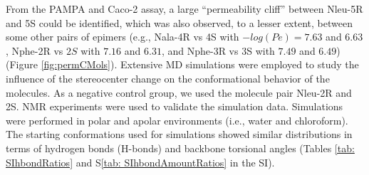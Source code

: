 From the PAMPA and Caco-2 assay, a large “permeability cliff”  between Nleu-5R and 5S could be identified, which was also observed, to a lesser extent, between some other pairs of epimers (e.g., Nala-4R vs 4S with $−log(Pe) = 7.63$ and $6.63$, Nphe-2R vs $2S$ with $7.16$ and $6.31$, and Nphe-3R vs 3S with $7.49$ and $6.49$) (Figure \ref{fig:permCMols}). 
Extensive MD simulations were employed to study the influence of the stereocenter change on the conformational behavior of the molecules. As a negative control group, we used the molecule pair Nleu-2R and 2S. 
NMR experiments were used to validate the simulation data. Simulations were performed in polar and apolar environments (i.e., water and chloroform). 
The starting conformations used for simulations showed similar distributions in terms of hydrogen bonds (H-bonds) and backbone torsional angles (Tables \ref{tab: SIhbondRatios} and S\ref{tab: SIhbondAmountRatios} in the SI). 

\begin{table}[]
\centering
\caption{Hydrogen bond occurrence in percentage for the starting conformations of
Nleu-5R, Nleu-5S, Nleu-2R, and Nleu-2S.}
\label{tab: SIhbondRatios}
\end{table}


\begin{table}[]
\centering
\caption{ Percentage of starting conformations with zero, one, or two hydrogen bonds for
Nleu-5R, Nleu-5S, Nleu-2R, and Nleu-2S.}
\label{tab: SIhbondAmountRatios}
\end{table}


